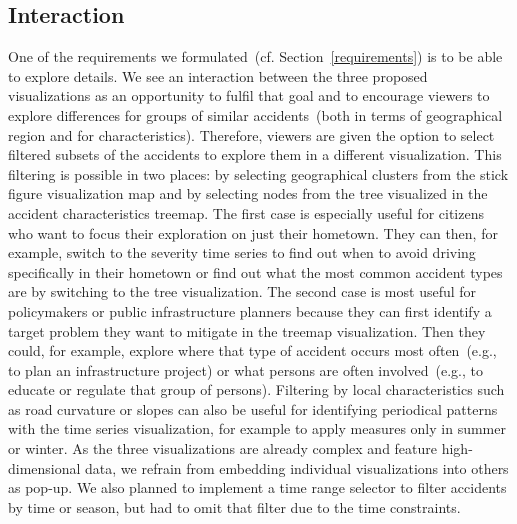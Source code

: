 \subsection{Interaction}
\label{interaction}
One of the requirements we formulated~(cf. Section~\ref{requirements}) is to be able to explore details. 
We see an interaction between the three proposed visualizations as an opportunity to fulfil that goal and to encourage viewers to explore differences for groups of similar accidents~(both in terms of geographical region and for characteristics).
Therefore, viewers are given the option to select filtered subsets of the accidents to explore them in a different visualization.
This filtering is possible in two places: \Ni by selecting geographical clusters from the stick figure visualization map and \Nii by selecting nodes from the tree visualized in the accident characteristics treemap.
The first case is especially useful for citizens who want to focus their exploration on just their hometown. They can then, for example, switch to the severity time series to find out when to avoid driving specifically in their hometown or find out what the most common accident types are by switching to the tree visualization. The second case is most useful for policymakers or public infrastructure planners because they can first identify a target problem they want to mitigate in the treemap visualization. Then they could, for example, explore where that type of accident occurs most often~(e.g., to plan an infrastructure project) or what persons are often involved~(e.g., to educate or regulate that group of persons). Filtering by local characteristics such as road curvature or slopes can also be useful for identifying periodical patterns with the time series visualization, for example to apply measures only in summer or winter.
As the three visualizations are already complex and feature high-dimensional data, we refrain from embedding individual visualizations into others as pop-up.
We also planned to implement a time range selector to filter accidents by time or season, but had to omit that filter due to the time constraints.
